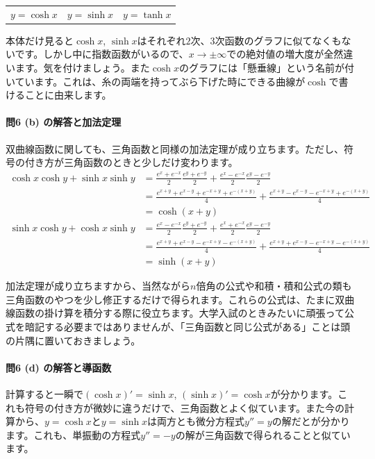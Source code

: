 \begin{table}[h!tbp]
\begin{center}
\begin{tabular}{ccc}
$y = \cosh x$ & $y = \sinh x$ & $y = \tanh x$
\end{tabular}
\end{center}
\end{table}

本体だけ見ると$\cosh x$, $\sinh x$はそれぞれ$2$次、$3$次函数のグラフに似てなくもないです。しかし中に指数函数がいるので、$x\rightarrow\pm\infty$での絶対値の増大度が全然違います。気を付けましょう。また$\cosh x$のグラフには「懸垂線」という名前が付いています。これは、糸の両端を持ってぶら下げた時にできる曲線が$\cosh$で書けることに由来します。

\paragraph{問6 (b) の解答と加法定理}
双曲線函数に関しても、三角函数と同様の加法定理が成り立ちます。ただし、符号の付き方が三角函数のときと少しだけ変わります。
\begin{align*}
\cosh x \cosh y + \sinh x \sinh y
&= \frac{e^x + e^{-x}}{2} \frac{e^y + e^{-y}}{2} + \frac{e^x - e^{-x}}{2}\frac{e^y - e^{-y}}{2} \\
&= \frac{e^{x+y} + e^{x-y} + e^{-x+y} + e^{-(x+y)}}{4} + \frac{e^{x+y} - e^{x-y} - e^{-x+y} + e^{-(x+y)}}{4} \\
&= \cosh(x+y) \\
\sinh x \cosh y + \cosh x \sinh y
&= \frac{e^x - e^{-x}}{2} \frac{e^y + e^{-y}}{2} + \frac{e^x + e^{-x}}{2}\frac{e^y - e^{-y}}{2} \\
&= \frac{e^{x+y} + e^{x-y} - e^{-x+y} - e^{-(x+y)}}{4} + \frac{e^{x+y} + e^{x-y} - e^{-x+y} - e^{-(x+y)}}{4} \\
&= \sinh(x+y)
\end{align*}

加法定理が成り立ちますから、当然ながら$n$倍角の公式や和積・積和公式の類も三角函数のやつを少し修正するだけで得られます。これらの公式は、たまに双曲線函数の掛け算を積分する際に役立ちます。大学入試のときみたいに頑張って公式を暗記する必要まではありませんが、「三角函数と同じ公式がある」ことは頭の片隅に置いておきましょう。

\paragraph{問6 (d) の解答と導函数}
計算すると一瞬で$(\cosh x)' = \sinh x $, $(\sinh x)' = \cosh x$が分かります。これも符号の付き方が微妙に違うだけで、三角函数とよく似ています。また今の計算から、$y=\cosh x$と$y=\sinh x$は両方とも微分方程式$y''=y$の解だとが分かります。これも、単振動の方程式$y''=-y$の解が三角函数で得られることと似ています。

